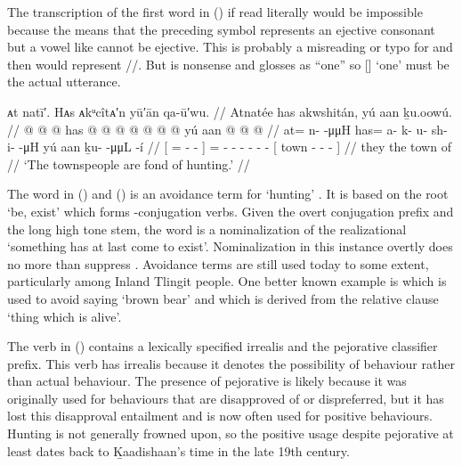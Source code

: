 The transcription of the first word  in (\lastx) if read literally would be impossible because the \orth{!} means that the preceding symbol represents an ejective consonant but a vowel like  cannot be ejective.
This is probably a misreading or typo for  and then  would represent  //.
But  is nonsense and \citeauthor{swanton:1909} glosses  as “one” so  [] ‘one’ must be the actual utterance.

\ex\label{ex:106-2-fond-of-hunting}%
%
\begingl
	\glpreamble	ᴀt natī′.
Hᴀs ᴀkᵘcîtᴀ′n yū′ān qa-ū′wu. //
	\glpreamble	Atnatée has akwshitán, yú aan ḵu.oowú. //
	\gla	{}  @ {} @ {} @ {} {}
			has @  @ {} @ {} @ {} @ {} @ {} @ {}
			{} yú aan  @ {} @ {} @ {} {} //
	\glb	{} at= n-  -μμH {}
			has= a- k- u- sh- i-  -μH
			{} yú aan ḵu-  -μμL -í {} //
	\glc	{}[ = -  - {}]
			= - - - - -  -
			{}[  town -  - - {}] //
	\gld	{}  {} {} {} {} 
			they  {} {} {} {} {} {}
			{} the town  {} {} \·of {} //
	\glft	‘The townspeople are fond of hunting.’
		//
\endgl
\xe

The word  in (\lastx) and (\nextx) is an avoidance term for  ‘hunting’ \parencite[06/158]{leer:1973}.
It is based on the root  ‘be, exist’ which forms -conjugation verbs.
Given the overt  conjugation prefix and the long high tone  stem, the word  is a nominalization of the realizational  ‘something has at last come to exist’.
Nominalization in this instance overtly does no more than suppress .
Avoidance terms are still used today to some extent, particularly among Inland Tlingit people.
One better known example is  which is used to avoid saying  ‘brown bear’ and which is derived from the relative clause  ‘thing which is alive’.

The verb  in (\lastx) contains a lexically specified irrealis  and the pejorative  classifier prefix.
This verb has irrealis because it denotes the possibility of behaviour rather than actual behaviour.
The presence of pejorative  is likely because it was originally used for behaviours that are disapproved of or dispreferred, but it has lost this disapproval entailment and is now often used for positive behaviours.
Hunting is not generally frowned upon, so the positive usage despite pejorative  at least dates back to Ḵaadishaan’s time in the late 19th century.

